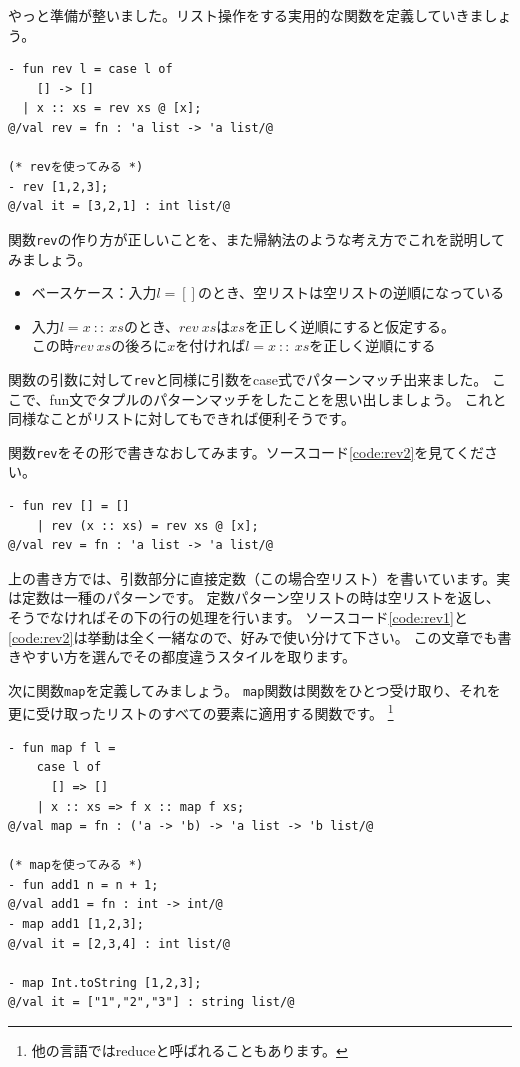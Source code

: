 \documentclass[11pt,a4paper]{article}
\begin{document}
やっと準備が整いました。リスト操作をする実用的な関数を定義していきましょう。

\begin{lstlisting}[caption=リストを逆順にする関数revを定義する,label=code:rev1]
- fun rev l = case l of
    [] -> []
  | x :: xs = rev xs @ [x];
@/val rev = fn : 'a list -> 'a list/@

(* revを使ってみる *)
- rev [1,2,3];
@/val it = [3,2,1] : int list/@
\end{lstlisting}

関数\lstinline{rev}の作り方が正しいことを、また帰納法のような考え方でこれを説明してみましょう。
\begin{itemize}
\item ベースケース：入力$l=[]$のとき、空リストは空リストの逆順になっている
\item 入力$l = x \ :: \ xs$のとき、$rev \ xs$は$xs$を正しく逆順にすると仮定する。\\
  この時$rev \ xs$の後ろに$x$を付ければ$l = x \ :: \ xs$を正しく逆順にする
\end{itemize}

関数の引数に対して\lstinline{rev}と同様に引数をcase式でパターンマッチ出来ました。
ここで、fun文でタプルのパターンマッチをしたことを思い出しましょう。
これと同様なことがリストに対してもできれば便利そうです。

関数\lstinline{rev}をその形で書きなおしてみます。ソースコード\ref{code:rev2}を見てください。

\begin{lstlisting}[caption=引数部分でのパターンマッチ,label=code:rev2]
- fun rev [] = []
    | rev (x :: xs) = rev xs @ [x];
@/val rev = fn : 'a list -> 'a list/@
\end{lstlisting}

上の書き方では、引数部分に直接定数（この場合空リスト）を書いています。実は定数は一種のパターンです。
定数パターン空リストの時は空リストを返し、そうでなければその下の行の処理を行います。
ソースコード\ref{code:rev1}と\ref{code:rev2}は挙動は全く一緒なので、好みで使い分けて下さい。
この文章でも書きやすい方を選んでその都度違うスタイルを取ります。

次に関数\lstinline{map}を定義してみましょう。
\lstinline{map}関数は関数をひとつ受け取り、それを更に受け取ったリストのすべての要素に適用する関数です。
\footnote{他の言語ではreduceと呼ばれることもあります。}

\begin{lstlisting}[caption=関数fとリストlを受け取り、lの要素全てにfを適用する関数, label=code:map]
- fun map f l =
    case l of
      [] => []
    | x :: xs => f x :: map f xs;
@/val map = fn : ('a -> 'b) -> 'a list -> 'b list/@

(* mapを使ってみる *)
- fun add1 n = n + 1;
@/val add1 = fn : int -> int/@
- map add1 [1,2,3];
@/val it = [2,3,4] : int list/@

- map Int.toString [1,2,3];
@/val it = ["1","2","3"] : string list/@
\end{lstlisting}
\end{document}
